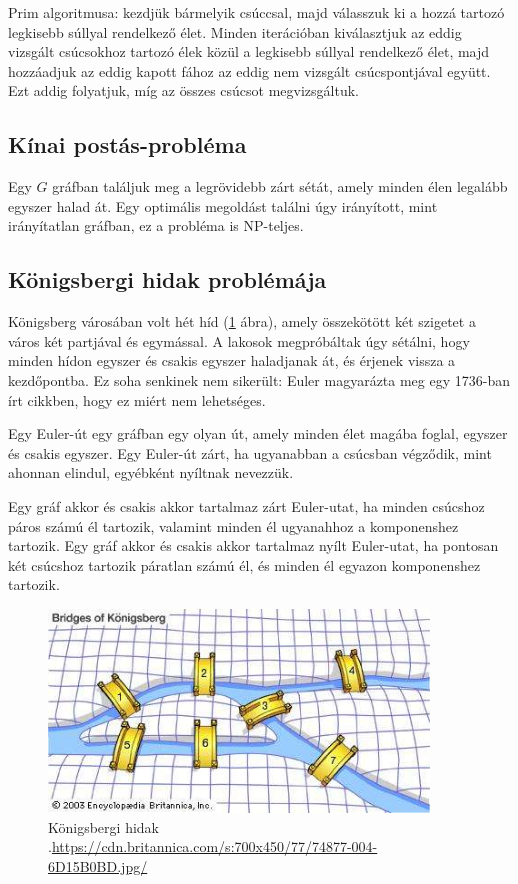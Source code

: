 Prim algoritmusa: kezdjük bármelyik csúccsal, majd válasszuk ki a hozzá tartozó legkisebb súllyal rendelkező élet. Minden iterációban kiválasztjuk az eddig vizsgált csúcsokhoz tartozó élek közül a legkisebb súllyal rendelkező élet, majd hozzáadjuk az eddig kapott fához az eddig nem vizsgált csúcspontjával együtt. Ezt addig folyatjuk, míg az összes csúcsot megvizsgáltuk.

\subsection{Kínai postás-probléma}

Egy \(G\) gráfban találjuk meg a legrövidebb zárt sétát, amely minden élen legalább egyszer halad át. Egy optimális megoldást találni úgy irányított, mint irányítatlan gráfban, ez a probléma is NP-teljes.

\subsection{Königsbergi hidak problémája}

Königsberg városában volt hét híd (\ref{fig:ALAP:sm1} ábra), amely összekötött két szigetet a város két partjával és egymással. A lakosok megpróbáltak úgy sétálni, hogy minden hídon egyszer és csakis egyszer haladjanak át, és érjenek vissza a kezdőpontba. Ez soha senkinek nem sikerült: Euler magyarázta meg egy 1736-ban írt cikkben, hogy ez miért nem lehetséges.

Egy Euler-út egy gráfban egy olyan út, amely minden élet magába foglal, egyszer és csakis egyszer. Egy Euler-út zárt, ha ugyanabban a csúcsban végződik, mint ahonnan elindul, egyébként nyíltnak nevezzük.

Egy gráf akkor és csakis akkor tartalmaz zárt Euler-utat, ha minden csúcshoz páros számú él tartozik, valamint minden él ugyanahhoz a komponenshez tartozik. Egy gráf akkor és csakis akkor tartalmaz nyílt Euler-utat, ha pontosan két csúcshoz tartozik páratlan számú él, és minden él egyazon komponenshez tartozik.

\begin{figure}
	\centering
	\setlength{\abovecaptionskip}{0pt}
	\setlength{\belowcaptionskip}{0pt}
	\includegraphics[width=0.9\textwidth, scale=0.9]{images/konigsberg}
	\caption[]%
	{Königsbergi hidak\\
		{\white .}\hfill\url{https://cdn.britannica.com/s:700x450/77/74877-004-6D15B0BD.jpg/}}
	\label{fig:ALAP:sm1}
\end{figure}

